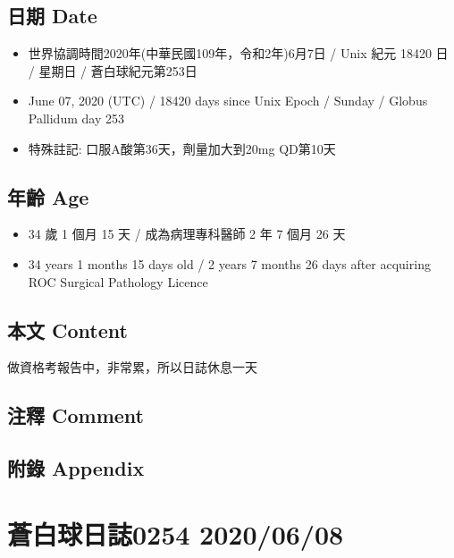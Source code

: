 \documentclass[
]{article}
\providecommand{\tightlist}{%
  \setlength{\itemsep}{0pt}\setlength{\parskip}{0pt}}
\begin{document}
\hypertarget{ux65e5ux671f-date-6}{%
\subsection{日期 Date}\label{ux65e5ux671f-date-6}}

\begin{itemize}
\tightlist
\item
  世界協調時間2020年(中華民國109年，令和2年)6月7日 / Unix 紀元 18420 日
  / 星期日 / 蒼白球紀元第253日
\item
  June 07, 2020 (UTC) / 18420 days since Unix Epoch / Sunday / Globus
  Pallidum day 253
\item
  特殊註記: 口服A酸第36天，劑量加大到20mg QD第10天
\end{itemize}

\hypertarget{ux5e74ux9f61-age-6}{%
\subsection{年齡 Age}\label{ux5e74ux9f61-age-6}}

\begin{itemize}
\tightlist
\item
  34 歲 1 個月 15 天 / 成為病理專科醫師 2 年 7 個月 26 天
\item
  34 years 1 months 15 days old / 2 years 7 months 26 days after
  acquiring ROC Surgical Pathology Licence
\end{itemize}

\hypertarget{ux672cux6587-content-6}{%
\subsection{本文 Content}\label{ux672cux6587-content-6}}

做資格考報告中，非常累，所以日誌休息一天

\hypertarget{ux6ce8ux91cb-comment-6}{%
\subsection{注釋 Comment}\label{ux6ce8ux91cb-comment-6}}

\hypertarget{ux9644ux9304-appendix-6}{%
\subsection{附錄 Appendix}\label{ux9644ux9304-appendix-6}}

\hypertarget{ux84bcux767dux7403ux65e5ux8a8c0254-20200608}{%
\section{蒼白球日誌0254
2020/06/08}\label{ux84bcux767dux7403ux65e5ux8a8c0254-20200608}}
\end{document}
